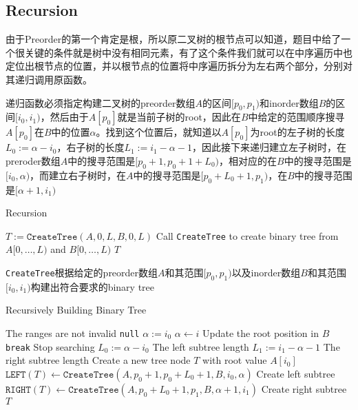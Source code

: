 \subsection{Recursion}
由于Preorder的第一个肯定是根，所以原二叉树的根节点可以知道，题目中给了一个很关键的条件就是树中没有相同元素，有了这个条件我们就可以在中序遍历中也定位出根节点的位置，并以根节点的位置将中序遍历拆分为左右两个部分，分别对其递归调用原函数。
\par
递归函数必须指定构建二叉树的preorder数组$A$的区间$[p_0, p_1)$和inorder数组$B$的区间$[i_0,i_1)$，然后由于$A[p_0]$就是当前子树的root，因此在$B$中给定的范围顺序搜寻$A[p_0]$在$B$中的位置$\alpha$。找到这个位置后，就知道以$A[p_0]$为root的左子树的长度$L_0:=\alpha - i_0$，右子树的长度$L_1:=i_1 - \alpha - 1$，因此接下来递归建立左子树时，在preroder数组$A$中的搜寻范围是$[p_0+1, p_0+1+L_0)$，相对应的在$B$中的搜寻范围是$[i_0, \alpha)$，而建立右子树时，在$A$中的搜寻范围是$[p_0+L_0+1, p_1)$，在$B$中的搜寻范围是$[\alpha+1, i_1)$
\setcounter{algorithm}{0}
\begin{algorithm}[H]
\caption{Recursion}
\begin{algorithmic}[1]
\State $T:=\texttt{CreateTree}(A, 0, L, B, 0, L)$ \Comment Call \texttt{CreateTree} to create binary tree from $A[0,\ldots, L)$ and $B[0,\ldots,L)$
\State \Return $T$
\EndProcedure
\end{algorithmic}
\end{algorithm}
\texttt{CreateTree}根据给定的preorder数组$A$和其范围$[p_0, p_1)$以及inorder数组$B$和其范围$[i_0, i_1)$构建出符合要求的binary tree
\begin{algorithm}[H]
\caption{Recursively Building Binary Tree}
\begin{algorithmic}[1]
 \Comment The ranges are not invalid
\State \Return \texttt{null}
\EndIf
\State $\alpha:=i_0$
\State $\alpha\gets i$ \Comment Update the root position in $B$
\State \texttt{break} \Comment Stop searching
\EndIf
\EndFor
\State $L_0:=\alpha - i_0$ \Comment The left subtree length
\State $L_1:=i_1 - \alpha - 1$ \Comment The right subtree length
\State Create a new tree node $T$ with root value $A[i_0]$
\State $\texttt{LEFT}(T)\gets \texttt{CreateTree}(A, p_0+1, p_0+L_0+1, B, i_0, \alpha)$ \Comment Create left subtree
\State $\texttt{RIGHT}(T) \gets \texttt{CreateTree}(A, p_0+L_0+1, p_1, B, \alpha+1, i_1)$ \Comment Create right subtree
\State \Return $T$
\EndFunction
\end{algorithmic}
\end{algorithm}